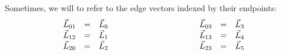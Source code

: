 Sometimes, we will to refer to the edge vectors indexed by their endpoints:
\begin{equation*}
\begin{array}{lcl}
\vec L_{01} &=& \vec L_0\\
\vec L_{12} &=& \vec L_1\\
\vec L_{20} &=& \vec L_2
\end{array}\rule{10em}{0pt}
\begin{array}{lcl}
\vec L_{03} &=& \vec L_3\\
\vec L_{13} &=& \vec L_4\\
\vec L_{23} &=& \vec L_5
\end{array}
\end{equation*}

\newcommand{\tetmetrictable}[8]{%
  \begin{center}
  \begin{tabular}{ll}
    \multicolumn{2}{r}{\textbf{\sffamily\Large tetrahedral #1}}\\\hline
    Dimension:                            & #2\\ 
    Acceptable Range:                     & #3\\ 
    Normal Range:                         & #4\\ 
    Full Range:                           & #5\\ 
    $q$ for unit equilateral tetrahedron: & #6\\
    Reference:                            & #7\\
    \verd\ function:       & \texttt{#8}\\ \hline
  \end{tabular} 
  \end{center}
}
\clearpage
\newpage 
\newpage 
\newpage 
\newpage 
\newpage 
\newpage 
\newpage 
\newpage 
\newpage 
\newpage 
\newpage 
\newpage 
\newpage 
\newpage 
\newpage 
\newpage 
\newpage 
